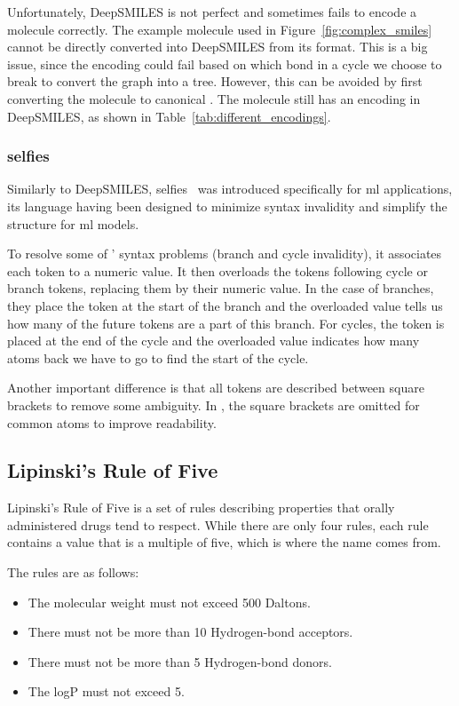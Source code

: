 \documentclass[../Document.tex]{subfiles}
\begin{document}
Unfortunately, DeepSMILES is not perfect and sometimes fails to encode a molecule correctly. The example molecule used in Figure~\ref{fig:complex_smiles} cannot be directly converted into DeepSMILES from its \smiles format. This is a big issue, since the encoding could fail based on which bond in a cycle we choose to break to convert the graph into a tree. However, this can be avoided by first converting the molecule to canonical \smiles. The molecule still has an encoding in DeepSMILES, as shown in Table~\ref{tab:different_encodings}.

\subsubsection{\acrshort{selfies}}
Similarly to DeepSMILES, \gls{selfies}~\cite{selfies_intro} was introduced specifically for \gls{ml} applications, its language having been designed to minimize syntax invalidity and simplify the structure for \gls{ml} models.

To resolve some of \smiles' syntax problems (\ie branch and cycle invalidity), it associates each token to a numeric value. It then overloads the tokens following cycle or branch tokens, replacing them by their numeric value. In the case of branches, they place the token at the start of the branch and the overloaded value tells us how many of the future tokens are a part of this branch. For cycles, the token is placed at the end of the cycle and the overloaded value indicates how many atoms back we have to go to find the start of the cycle.

Another important difference is that all tokens are described between square brackets to remove some ambiguity. In \smiles, the square brackets are omitted for common atoms to improve readability.


\subsection{Lipinski's Rule of Five}
\label{sec:lipinski-rules}
Lipinski's Rule of Five is a set of rules describing properties that orally administered drugs tend to respect. While there are only four rules, each rule contains a value that is a multiple of five, which is where the name comes from. 

The rules are as follows:
\begin{itemize}
    \item The molecular weight must not exceed 500 Daltons.
    \item There must not be more than 10 Hydrogen-bond acceptors.
    \item There must not be more than 5 Hydrogen-bond donors.
    \item The logP must not exceed 5.
\end{itemize}
\end{document}
